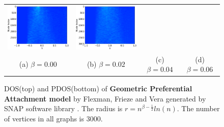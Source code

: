 \documentclass[senior,final,11pt]{iscs-thesis}
\begin{document}
\begin{figure}[htbp]
\begin{tabular}{cccc}
    \includegraphics[width=45mm]{figure/scale-free_geometric_3000_5_004txt_pdos.png} &
    \includegraphics[width=45mm]{figure/scale-free_geometric_3000_5_006txt_pdos.png} \\
    (a) $\beta=0.00$ & (b) $\beta=0.02$ & (c) $\beta=0.04$ & (d) $\beta=0.06$\\ [6pt]
  \end{tabular}
  \caption{DOS(top) and PDOS(bottom) of {\bf Geometric Preferential Attachment model} by Flexman, Frieze and Vera \cite{flaxman2006geometric} generated by SNAP software library \cite{leskovec2016snap}. The radius is $r = n^{\beta - \frac{1}{2}}ln(n)$. The number of vertices in all graphs is 3000.}
  \label{fig:geo_scale_free}
\end{figure}
\end{document}
